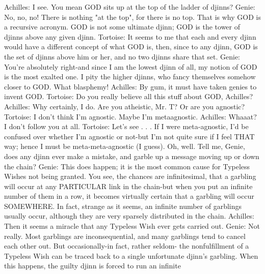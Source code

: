           Achilles: I see. You mean GOD sits up at the top of the ladder of djinns?
          Genie: No, no, no! There is nothing "at the top", for there is no top. That is
                 why GOD is a recursive acronym. GOD is not some ultimate djinn;
                 GOD is the tower of djinns above any given djinn.
          Tortoise: It seems to me that each and every djinn would have a different
                 concept of what GOD is, then, since to any djinn, GOD is the set of
                 djinns above him or her, and no two djinns share that set.
          Genie: You're absolutely right-and since I am the lowest djinn of all, my
                 notion of GOD is the most exalted one. I pity the higher djinns, who
                 fancy themselves somehow closer to GOD. What blasphemy!
          Achilles: By gum, it must have taken genies to invent GOD.
          Tortoise: Do you really believe all this stuff about GOD, Achilles?
          Achilles: Why certainly, I do. Are you atheistic, Mr. T? Or are you agnostic?
          Tortoise: I don't think I'm agnostic. Maybe I'm metaagnostic.
          Achilles: Whaaat? I don't follow you at all.
          Tortoise: Let's see . . . If I were meta-agnostic, I'd be confused over whether
                 I'm agnostic or not-but I'm not quite sure if I feel THAT way; hence I
                 must be meta-meta-agnostic (I guess). Oh, well. Tell me, Genie, does
                 any djinn ever make a mistake, and garble up a message moving up or
                 down the chain?
          Genie: This does happen; it is the most common cause for Typeless Wishes
                 not being granted. You see, the chances are infinitesimal, that a
                 garbling will occur at any PARTICULAR link in the chain-but when
                 you put an infinite number of them in a row, it becomes virtually
                 certain that a garbling will occur SOMEWHERE. In fact, strange as it
                 seems, an infinite number of garblings usually occur, although they
                 are very sparsely distributed in the chain.
          Achilles: Then it seems a miracle that any Typeless Wish ever gets carried
                 out.
          Genie: Not really. Most garblings are inconsequential, and many garblings
                 tend to cancel each other out. But occasionally-in fact, rather seldom-
                 the nonfulfillment of a Typeless Wish can be traced back to a single
                 unfortunate djinn's garbling. When this happens, the guilty djinn is
                 forced to run an infinite




